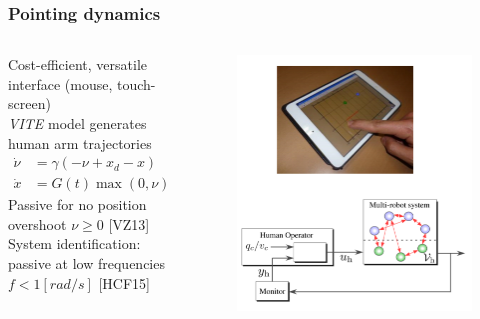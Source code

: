 \documentclass[student]{ITRslides}
\begin{document}
\begin{frame}
	\frametitle{Pointing dynamics}
	
	
	
	
	\begin{columns}
Cost-efficient, versatile interface (mouse, touch-screen)\\
\emph{VITE} model generates human arm trajectories 
\begin{align*}
\dot{\nu} &= \gamma(-\nu + x_d - x) \\
\dot{x} &= G(t) \max(0,\nu)
\end{align*}
Passive for no position overshoot $\nu \geq 0$ \nocite{Varnell2013}{\tiny [VZ13]}\\
System identification: passive at low frequencies $f < 1[rad/s]$ \nocite{Hatanaka2015}{\tiny [HCF15]}
			\begin{figure}
			\centering
			\includegraphics[width=1.1\textwidth]{HumanSwarmPres.png}			
			\end{figure}			
		\end{columns}
		


\end{frame}
\end{document}
